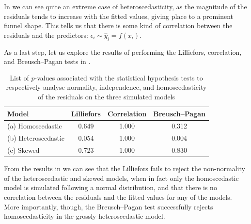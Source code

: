 \begin{example}
	In  we can see quite an extreme case of heteroscedasticity, as the magnitude of the residuals tends to increase with the fitted values, giving place to a prominent funnel shape. This tells us that there is some kind of correlation between the residuals and the predictors: $\epsilon_{i} \sim \hat{y}_{i} = f(x_{i})$.

	As a last step, let us explore the results of performing the Lilliefors, correlation, and Breusch--Pagan tests in .
	\begin{table}[H]
		\centering
		\begin{tabular}{lccc}
			\toprule
			\toprule
			Model           & Lilliefors  & Correlation & Breusch--Pagan \\
			\midrule
			(a) Homoscedastic   & \num{0.649} & \num{1.000} & \num{0.312} \\
			(b) Heteroscedastic & \num{0.054} & \num{1.000} & \num{0.004} \\
			(c) Skewed          & \num{0.723} & \num{1.000} & \num{0.830} \\
			\bottomrule
		\end{tabular}
		\caption{List of $p$-values associated with the statistical hypothesis tests to respectively analyse normality, independence, and homoscedasticity of the residuals on the three simulated models}
		\label{tab:stat-tests-example}
	\end{table}

	From the results in  we can see that the Lilliefors fails to reject the non-normality of the heteroscedastic and skewed models, when in fact only the homoscedastic model is simulated following a normal distribution, and that there is no correlation between the residuals and the fitted values for any of the models. More importantly, though, the Breusch--Pagan test successfully rejects homoscedasticity in the grossly heteroscedastic model.
\end{example}

